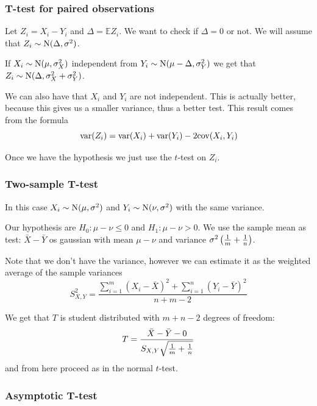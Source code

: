 \documentclass[12pt]{extarticle}
\newcommand{\cov}{{\operatorfont cov}}
\renewcommand{\var}{{\operatorfont var}}
\newcommand{\Normal}{{\operatorfont N}}
\begin{document}
\subsubsection{T-test for paired observations}

Let $Z_i = X_i - Y_i$ and $\Delta = \mathbb E Z_i$.
We want to check if $\Delta = 0$ or not.
We will assume that $Z_i \sim \Normal(\Delta, \sigma^2)$.

If $X_i \sim \Normal(\mu, \sigma_X^2)$ independent from $Y_i \sim \Normal(\mu - \Delta, \sigma_Y^2)$
we get that $Z_i \sim \Normal(\Delta, \sigma_X^2 + \sigma_Y^2)$.

We can also have that $X_i$ and $Y_i$ are not independent.
This is actually better, because this gives us a smaller variance, thus a better test.
This result comes from the formula
\begin{equation}
    \var(Z_i) = \var(X_i) + \var(Y_i) - 2 \cov (X_i, Y_i)
\end{equation}

Once we have the hypothesis we just use the $t$-test on $Z_i$.

\subsubsection{Two-sample T-test}

In this case $X_i \sim \Normal(\mu, \sigma^2)$ and $Y_i \sim \Normal(\nu, \sigma^2)$
with the same variance.

Our hypothesis are $H_0 : \mu - \nu \leq 0$ and $H_1 : \mu - \nu > 0$.
We use the sample mean as test: $\bar X- \bar Y$ os gaussian with mean $\mu - \nu$
and variance $\sigma^2 \left(\frac{1}{m} + \frac{1}{n}\right)$.

Note that we don't have the variance, however we can estimate it as the weighted average of the sample variances
\begin{equation}
    S^2_{X, Y} = \frac{\sum^m_{i = 1} (X_i - \bar X)^2 + \sum^n_{i = 1} (Y_i - \bar Y)^2 }{n + m - 2}
\end{equation}

We get that $T$ is student distributed with $m + n - 2$ degrees of freedom:
\begin{equation}
    T = \frac{\bar X - \bar Y - 0}{S_{X, Y} \sqrt{\frac{1}{m} + \frac{1}{n}}}
\end{equation}
and from here proceed as in the normal $t$-test.

\subsubsection{Asymptotic T-test}
\end{document}
